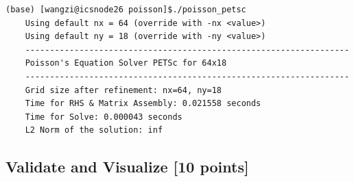 \documentclass[unicode,11pt,a4paper,oneside,numbers=endperiod,openany]{scrartcl}
\begin{document}
\begin{lstlisting}[language=MyBatch, style=mystyle, caption={PETSc Poisson Solver Output}]
	(base) [wangzi@icsnode26 poisson]$./poisson_petsc 
	Using default nx = 64 (override with -nx <value>)
	Using default ny = 18 (override with -ny <value>)
	------------------------------------------------------------------
	Poisson's Equation Solver PETSc for 64x18
	------------------------------------------------------------------
	Grid size after refinement: nx=64, ny=18
	Time for RHS & Matrix Assembly: 0.021558 seconds
	Time for Solve: 0.000043 seconds
	L2 Norm of the solution: inf
\end{lstlisting}
\subsection{Validate and Visualize [10 points]}
\end{document}
